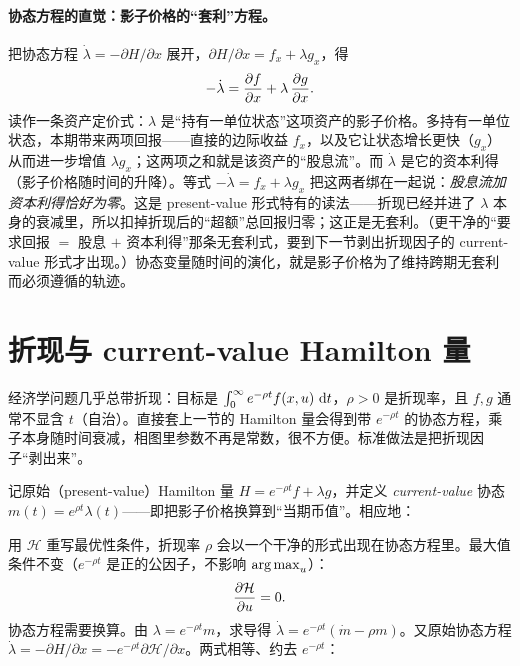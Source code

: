 \paragraph{协态方程的直觉：影子价格的``套利''方程。}
把协态方程 $\dot\lambda=-\partial H/\partial x$ 展开，$\partial H/\partial x=f_x+\lambda g_x$，得
\[
    -\dot\lambda=\frac{\partial f}{\partial x}+\lambda\,\frac{\partial g}{\partial x} .
\]
读作一条资产定价式：$\lambda$ 是``持有一单位状态''这项资产的影子价格。多持有一单位状态，本期带来两项回报——直接的边际收益 $f_x$，以及它让状态增长更快（$g_x$）从而进一步增值 $\lambda g_x$；这两项之和就是该资产的``股息流''。而 $\dot\lambda$ 是它的资本利得（影子价格随时间的升降）。等式 $-\dot\lambda=f_x+\lambda g_x$ 把这两者绑在一起说：\emph{股息流加资本利得恰好为零}。这是 present-value 形式特有的读法——折现已经并进了 $\lambda$ 本身的衰减里，所以扣掉折现后的``超额''总回报归零；这正是无套利。（更干净的``要求回报 $=$ 股息 $+$ 资本利得''那条无套利式，要到下一节剥出折现因子的 current-value 形式才出现。）协态变量随时间的演化，就是影子价格为了维持跨期无套利而必须遵循的轨迹。

\section{折现与 current-value Hamilton 量}
\label{sec:optcontrol-4}

经济学问题几乎总带折现：目标是 $\int_0^\infty e^{-\rho t}f(x,u)\,\mathop{}\!\mathrm{d} t$，$\rho>0$ 是折现率，且 $f,g$ 通常不显含 $t$（自治）。直接套上一节的 Hamilton 量会得到带 $e^{-\rho t}$ 的协态方程，乘子本身随时间衰减，相图里参数不再是常数，很不方便。标准做法是把折现因子``剥出来''。

记原始（present-value）Hamilton 量 $H=e^{-\rho t}f+\lambda g$，并定义 \emph{current-value} 协态 $m(t)=e^{\rho t}\lambda(t)$——即把影子价格换算到``当期币值''。相应地：


用 $\mathcal H$ 重写最优性条件，折现率 $\rho$ 会以一个干净的形式出现在协态方程里。最大值条件不变（$e^{-\rho t}$ 是正的公因子，不影响 $\operatorname*{arg\,max}_u$）：
\[
    \frac{\partial \mathcal H}{\partial u}=0 .
\]
协态方程需要换算。由 $\lambda=e^{-\rho t}m$，求导得 $\dot\lambda=e^{-\rho t}(\dot m-\rho m)$。又原始协态方程 $\dot\lambda=-\partial H/\partial x=-e^{-\rho t}\partial\mathcal H/\partial x$。两式相等、约去 $e^{-\rho t}$：

